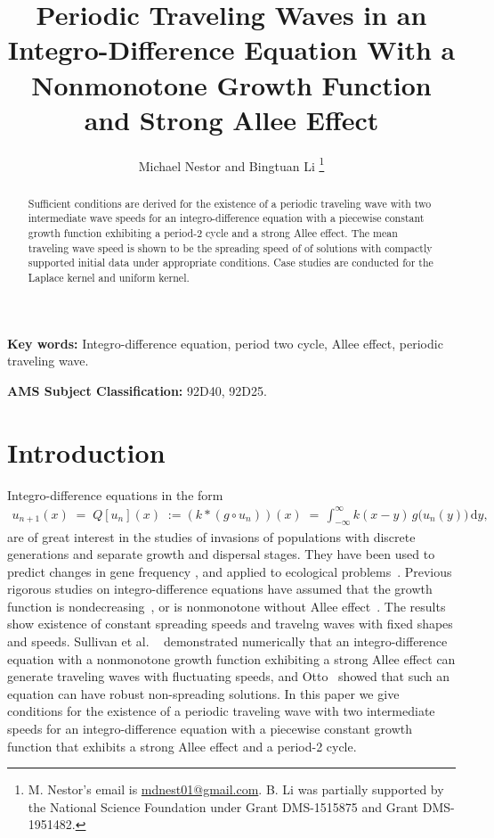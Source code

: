\documentclass[11pt]{article}
\title{Periodic Traveling Waves in an Integro-Difference Equation With a Nonmonotone Growth Function and Strong Allee Effect}
\date{}
\author{Michael Nestor and Bingtuan Li
\thanks{M. Nestor's email is \href{mailto:mdnest01@gmail.com}{mdnest01@gmail.com}. B. Li was partially supported by the National Science Foundation under Grant DMS-1515875 and Grant DMS-1951482.}}
\affil{Department of Mathematics, University of Louisville, \newline Louisville, KY 40292.}
\theoremstyle{definition}
\numberwithin{equation}{section}
\numberwithin{thm}{section}
\begin{document}
\maketitle
\begin{abstract}
Sufficient conditions are derived for the existence of a periodic traveling wave with two intermediate wave speeds for an integro-difference equation with a piecewise constant growth function exhibiting a period-2 cycle and a strong Allee effect. The mean traveling wave speed is shown to be the spreading speed of 
of solutions with compactly supported initial data under appropriate conditions. Case studies are conducted for the Laplace kernel and uniform kernel.
\end{abstract}


{\bf Key words:} Integro-difference equation, period two cycle, Allee effect, periodic traveling wave.
\newline


{\bf AMS Subject Classification:} 92D40, 92D25.



\section{Introduction}

Integro-difference equations in the form 
\begin{align}\label{q}
u_{n+1}(x)\;=\;Q[u_n](x)\;:=(k*(g\circ u_n))(x)\;=\,\int^{\infty}_{-\infty}k(x-y)\,g\big(u_n(y)\big)\,\mathrm{d}y,
\end{align}
are of great interest in the studies of invasions of populations with discrete generations and separate growth and dispersal stages. They have been used to predict changes in gene frequency \cite{lui82a, lui82b, lui83, slatkin, w78}, and applied to ecological problems~\cite{hh, ks, kot89, kot92, kotbook, lut, nkl,otto}. Previous rigorous studies on integro-difference equations have assumed that the growth function is nondecreasing~\cite{w78, wein82}, or  is nonmonotone without Allee effect~\cite{lui83, wang}. The results show existence of constant spreading speeds and travelng waves with fixed shapes and speeds.   Sullivan et al. ~\cite{pnas} demonstrated numerically  that an integro-difference equation with a nonmonotone growth function exhibiting  a strong Allee effect can generate traveling waves with fluctuating speeds, and Otto~\cite{otto} showed  that such an equation can have robust non-spreading solutions. In this paper we give conditions for the existence of a periodic traveling wave with two intermediate speeds for 
an integro-difference equation with a piecewise constant growth function that exhibits a strong Allee effect and a period-2 cycle. 
\end{document}
